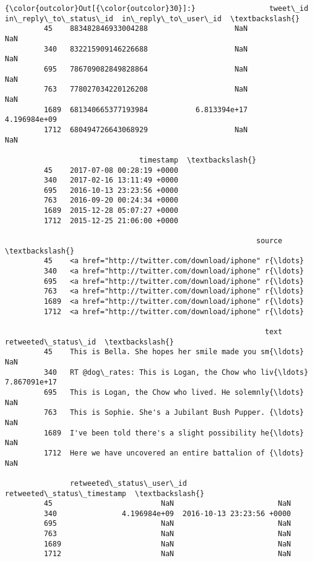 \documentclass[11pt]{article}
\begin{document}
\begin{Verbatim}[commandchars=\\\{\}]
{\color{outcolor}Out[{\color{outcolor}30}]:}                 tweet\_id  in\_reply\_to\_status\_id  in\_reply\_to\_user\_id  \textbackslash{}
         45    883482846933004288                    NaN                  NaN   
         340   832215909146226688                    NaN                  NaN   
         695   786709082849828864                    NaN                  NaN   
         763   778027034220126208                    NaN                  NaN   
         1689  681340665377193984           6.813394e+17         4.196984e+09   
         1712  680494726643068929                    NaN                  NaN   
         
                               timestamp  \textbackslash{}
         45    2017-07-08 00:28:19 +0000   
         340   2017-02-16 13:11:49 +0000   
         695   2016-10-13 23:23:56 +0000   
         763   2016-09-20 00:24:34 +0000   
         1689  2015-12-28 05:07:27 +0000   
         1712  2015-12-25 21:06:00 +0000   
         
                                                          source  \textbackslash{}
         45    <a href="http://twitter.com/download/iphone" r{\ldots}   
         340   <a href="http://twitter.com/download/iphone" r{\ldots}   
         695   <a href="http://twitter.com/download/iphone" r{\ldots}   
         763   <a href="http://twitter.com/download/iphone" r{\ldots}   
         1689  <a href="http://twitter.com/download/iphone" r{\ldots}   
         1712  <a href="http://twitter.com/download/iphone" r{\ldots}   
         
                                                            text  retweeted\_status\_id  \textbackslash{}
         45    This is Bella. She hopes her smile made you sm{\ldots}                  NaN   
         340   RT @dog\_rates: This is Logan, the Chow who liv{\ldots}         7.867091e+17   
         695   This is Logan, the Chow who lived. He solemnly{\ldots}                  NaN   
         763   This is Sophie. She's a Jubilant Bush Pupper. {\ldots}                  NaN   
         1689  I've been told there's a slight possibility he{\ldots}                  NaN   
         1712  Here we have uncovered an entire battalion of {\ldots}                  NaN   
         
               retweeted\_status\_user\_id retweeted\_status\_timestamp  \textbackslash{}
         45                         NaN                        NaN   
         340               4.196984e+09  2016-10-13 23:23:56 +0000   
         695                        NaN                        NaN   
         763                        NaN                        NaN   
         1689                       NaN                        NaN   
         1712                       NaN                        NaN   
         

\end{Verbatim}
\end{document}
